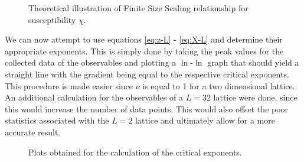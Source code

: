 \documentclass[a4paper]{article}
\begin{document}
\begin{figure}[htb]
  \centering%
  \caption{Theoretical illustration of Finite Size Scaling
    relationship for susceptibility $\chi$.}\label{fig:fss_show}
\end{figure}
We can now attempt to use equations \eqref{eq:z-L} - \eqref{eq:X-L} and
determine their appropriate exponents. This is simply done by taking
the peak values for the collected data of the observables and plotting
a $\ln$-$\ln$ graph that should yield a straight line with the gradient
being equal to the respective critical exponents. This procedure is
made easier since $\nu$ is equal to 1 for a two dimensional
lattice. An additional calculation for the observables of a $L=32$
lattice were done, since this would increase the number of data
points. This would also offset the poor statistics associated with the 
$L=2$ lattice and ultimately allow for a more accurate result.
\begin{figure}[htb]
  \centering
  \caption{Plots obtained for the calculation of the critical
    exponents.}\label{fig:fss} 
\end{figure}



 
\end{document}
